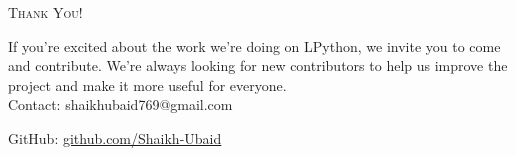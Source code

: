 \begin{frame}[standout]
    \Huge\textsc{Thank You!}

    \small If you're excited about the work we're doing on LPython, we invite you to come and contribute. We're always looking for new contributors to help us improve the project and make it more useful for everyone.
    \[\]
    \small
    Contact: shaikhubaid769@gmail.com

    GitHub: \href{https://github.com/Shaikh-Ubaid}{github.com/Shaikh-Ubaid}
\end{frame}
